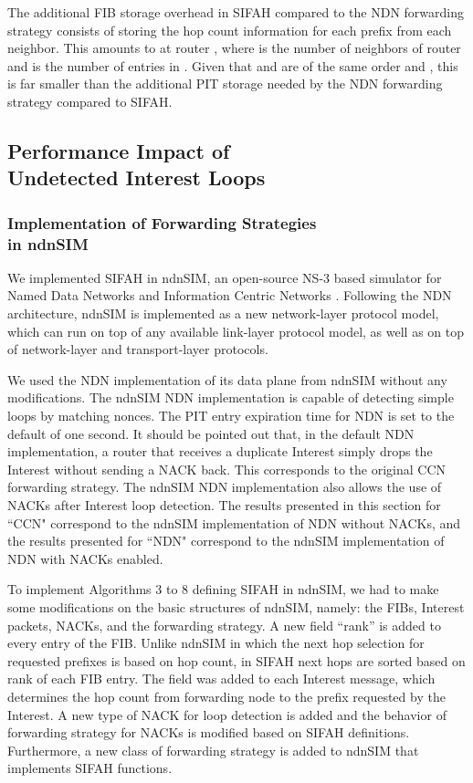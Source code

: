 \documentclass{ancs15-alternate}
\begin{document}
The additional FIB storage overhead  in SIFAH compared to the NDN forwarding strategy consists of storing the hop count information for each prefix  from each neighbor. This amounts to  at router , where  is the  number of neighbors of router  and 
 is the number of entries in . Given that  and  are of the same order and , this  is far smaller than the additional PIT storage needed by the NDN forwarding strategy compared to SIFAH.

\subsection{Performance Impact of \\Undetected Interest Loops }

\subsubsection{ Implementation of Forwarding Strategies \\in ndnSIM}

We implemented SIFAH in ndnSIM,   an open-source NS-3 based simulator for Named Data Networks and Information Centric Networks \cite{ndnSIM}. Following the NDN architecture, ndnSIM is implemented as a new network-layer protocol model, which can run on top of any available link-layer protocol model, as well as on top of network-layer and transport-layer protocols. 

We used the NDN implementation of its data plane from ndnSIM without any modifications.
The ndnSIM NDN implementation  is capable of detecting simple loops by matching nonces.
The PIT entry expiration time for NDN is set to the default of one second.  It should be pointed out that, in the default NDN implementation, a router that receives a duplicate Interest simply drops the Interest without sending a NACK back. This corresponds to the original CCN forwarding strategy. The ndnSIM NDN implementation also allows the use of NACKs after Interest loop detection. The results presented in this section for  ``CCN" correspond to the ndnSIM implementation of NDN without NACKs, and the results presented for  ``NDN" correspond to the ndnSIM implementation of NDN with NACKs enabled. 

To implement Algorithms 3 to 8 defining SIFAH in ndnSIM, we had to make some modifications on the basic structures of ndnSIM, namely:  the FIBs, Interest packets, NACKs, and the forwarding strategy. 
A new field ``rank'' is added to every entry of the FIB. Unlike ndnSIM in which the next hop selection for requested prefixes is based on hop count, in SIFAH next hops are sorted based on rank of each FIB entry.  
The field  was added to each Interest message, which determines the hop count from forwarding node  to the prefix requested by the Interest. 
A new type of NACK for loop detection is added and the behavior of forwarding strategy for NACKs is modified based on SIFAH definitions. Furthermore, a new class of forwarding strategy is added to ndnSIM that implements SIFAH functions.
 
\end{document}
